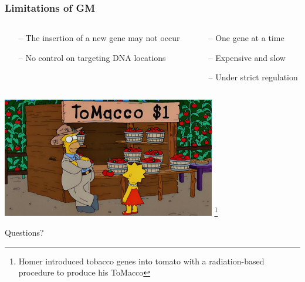 \documentclass[xcolor=dvipsnames]{beamer}
\newcommand\blfootnote[1]{%
	\begingroup
	\renewcommand\thefootnote{}\footnote{#1}%
	\addtocounter{footnote}{-1}%
	\endgroup
}
\begin{document}
\begin{frame}
	\frametitle{Limitations of GM}
	\begin{columns}
		\begin{column}{0.5\textwidth}
			\begin{itemize}
				\item[--] The insertion of a new gene may not occur
				\item[--] No control on targeting DNA locations 
				
				
			\end{itemize}
		\end{column}
		\begin{column}{0.5\textwidth}
			\begin{itemize}
				\item[--] One gene at a time
				\item[--] Expensive and slow
				\item[--] Under strict regulation
			\end{itemize}
			
		\end{column}
	\end{columns}
	\vspace{15pt}
	\centering	\includegraphics[keepaspectratio, width  = 0.7\textwidth]{img/tomacco}
	\blfootnote{Homer introduced tobacco genes into tomato with a radiation-based procedure to produce his ToMacco}
	
\end{frame}


\begin{frame}
	
	\Huge
	Questions? \\ 
	
\end{frame}
\end{document}
